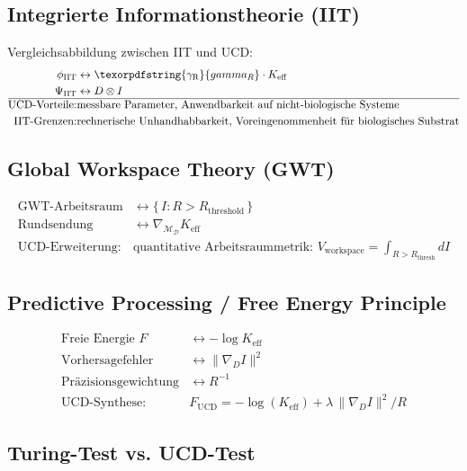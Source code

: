 \documentclass[12pt,a4paper]{article}
\DeclareRobustCommand{\gaR}{\texorpdfstring{\ensuremath{\gamma_{\mathrm{R}}}}{gamma_R}}
\newcommand{\eff}{\mathrm{eff}}
\newcommand{\Dict}{\mathcal{D}}
\newcommand{\Mdict}{\mathcal{M}_{\Dict}}
\newcommand{\Ke}{K_{\eff}}
\begin{document}
	\subsection{Integrierte Informationstheorie (IIT)}
	
	Vergleichsabbildung zwischen IIT und UCD:
	\[
	\begin{aligned}
		\phi_{\mathrm{IIT}} &\leftrightarrow \gaR \cdot \Ke \\
		\Psi_{\mathrm{IIT}} &\leftrightarrow D \otimes I \\
		\hline
		\text{UCD-Vorteile:} & \text{messbare Parameter, Anwendbarkeit auf nicht-biologische Systeme} \\
		\text{IIT-Grenzen:} & \text{rechnerische Unhandhabbarkeit, Voreingenommenheit für biologisches Substrat}
	\end{aligned}
	\]
	
	\subsection{Global Workspace Theory (GWT)}
	
	\[
	\begin{aligned}
		\text{GWT-Arbeitsraum} &\leftrightarrow \{\,I : R > R_{\mathrm{threshold}}\,\} \\
		\text{Rundsendung} &\leftrightarrow \nabla_{\Mdict} \Ke \\
		\hline
		\text{UCD-Erweiterung:} & \text{quantitative Arbeitsraummetrik: } V_{\mathrm{workspace}} = \int_{R>R_{\mathrm{thresh}}} dI
	\end{aligned}
	\]
	
	\subsection{Predictive Processing / Free Energy Principle}
	
	\[
	\begin{aligned}
		\text{Freie Energie } F &\leftrightarrow -\log \Ke \\
		\text{Vorhersagefehler} &\leftrightarrow \|\nabla_D I\|^2 \\
		\text{Präzisionsgewichtung} &\leftrightarrow R^{-1} \\
		\hline
		\text{UCD-Synthese:} & F_{\mathrm{UCD}} = -\log(\Ke) + \lambda\, \|\nabla_D I\|^2 / R
	\end{aligned}
	\]
	
	\subsection{Turing-Test vs. UCD-Test}
	
\end{document}
